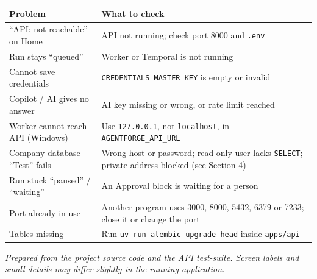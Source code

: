 \documentclass[11pt,a4paper]{article}
\newcommand{\env}[1]{\texttt{#1}}
\begin{document}
\begin{longtable}{@{}L{5.4cm}L{10.2cm}@{}}
\toprule
\textbf{Problem} & \textbf{What to check} \\
\midrule
\endhead
``API: not reachable'' on Home & API not running; check port 8000 and \texttt{.env} \\
Run stays ``queued'' & Worker or Temporal is not running \\
Cannot save credentials & \env{CREDENTIALS\_MASTER\_KEY} is empty or invalid \\
Copilot / AI gives no answer & AI key missing or wrong, or rate limit reached \\
Worker cannot reach API (Windows) & Use \texttt{127.0.0.1}, not \texttt{localhost}, in \env{AGENTFORGE\_API\_URL} \\
Company database ``Test'' fails & Wrong host or password; read-only user lacks \texttt{SELECT}; private address blocked (see Section 4) \\
Run stuck ``paused'' / ``waiting'' & An Approval block is waiting for a person \\
Port already in use & Another program uses 3000, 8000, 5432, 6379 or 7233; close it or change the port \\
Tables missing & Run \texttt{uv run alembic upgrade head} inside \texttt{apps/api} \\
\bottomrule
\end{longtable}

\vfill
\begin{center}
\footnotesize\textit{Prepared from the project source code and the API test-suite. Screen labels and
small details may differ slightly in the running application.}
\end{center}
\end{document}
